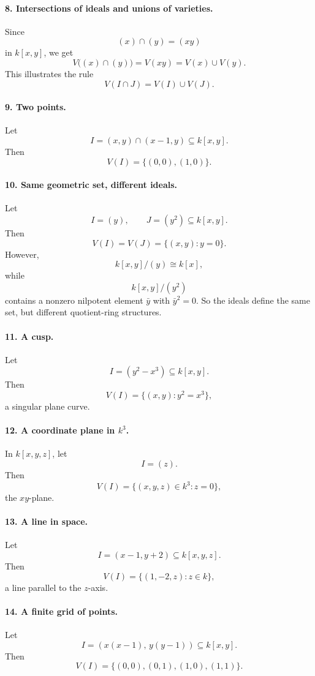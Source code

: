 \documentclass[12pt,a4paper]{article}
\theoremstyle{plain}
\theoremstyle{definition}      %
\begin{document}
	\paragraph{8. Intersections of ideals and unions of varieties.}
	Since
	\[
	(x)\cap(y)=(xy)
	\]
	in \(k[x,y]\), we get
	\[
	V\bigl((x)\cap(y)\bigr)=V(xy)=V(x)\cup V(y).
	\]
	This illustrates the rule
	\[
	V(I\cap J)=V(I)\cup V(J).
	\]
	
	\paragraph{9. Two points.}
	Let
	\[
	I=(x,y)\cap(x-1,y)\subseteq k[x,y].
	\]
	Then
	\[
	V(I)=\{(0,0),(1,0)\}.
	\]
	
	\paragraph{10. Same geometric set, different ideals.}
	Let
	\[
	I=(y),\qquad J=(y^2)\subseteq k[x,y].
	\]
	Then
	\[
	V(I)=V(J)=\{(x,y):y=0\}.
	\]
	However,
	\[
	k[x,y]/(y)\cong k[x],
	\]
	while
	\[
	k[x,y]/(y^2)
	\]
	contains a nonzero nilpotent element \(\bar y\) with \(\bar y^2=0\).
	So the ideals define the same set, but different quotient-ring structures.
	
	\paragraph{11. A cusp.}
	Let
	\[
	I=(y^2-x^3)\subseteq k[x,y].
	\]
	Then
	\[
	V(I)=\{(x,y):y^2=x^3\},
	\]
	a singular plane curve.
	
	\paragraph{12. A coordinate plane in \(k^3\).}
	In \(k[x,y,z]\), let
	\[
	I=(z).
	\]
	Then
	\[
	V(I)=\{(x,y,z)\in k^3:z=0\},
	\]
	the \(xy\)-plane.
	
	\paragraph{13. A line in space.}
	Let
	\[
	I=(x-1,y+2)\subseteq k[x,y,z].
	\]
	Then
	\[
	V(I)=\{(1,-2,z):z\in k\},
	\]
	a line parallel to the \(z\)-axis.
	
	\paragraph{14. A finite grid of points.}
	Let
	\[
	I=(x(x-1),\,y(y-1))\subseteq k[x,y].
	\]
	Then
	\[
	V(I)=\{(0,0),(0,1),(1,0),(1,1)\}.
	\]
	
\end{document}
